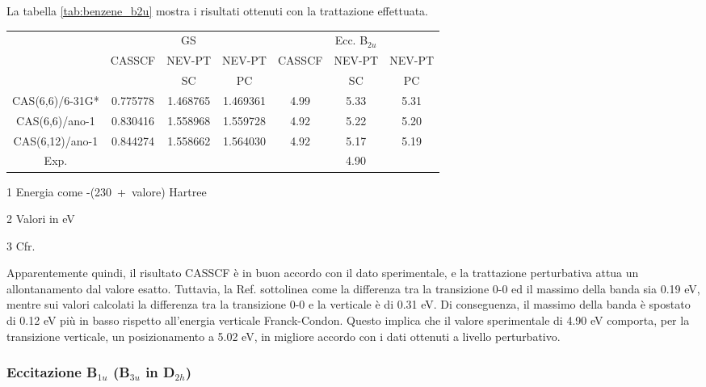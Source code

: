 La tabella \ref{tab:benzene_b2u} mostra i risultati ottenuti con la
trattazione effettuata.
\begin{center}
\begin{threeparttable}
\caption{\small Benzene - Energia della transizione di singoletto B$_{2u}$
(B$_{2u}$ in D$_{2h}$)}
\label{tab:benzene_b2u}
{
\small
\begin{tabular}{|c|ccc|ccc|}
\hline
 				& \multicolumn{3}{c|}{GS\tnote{1}}				& \multicolumn{3}{c|}{Ecc. B$_{2u}$\tnote{2}} \\
				& CASSCF	& NEV-PT	& NEV-PT	& CASSCF		& NEV-PT	& NEV-PT \\
				&			& SC		& PC		& 				& SC		& PC \\
\hline
CAS(6,6)/6-31G*	& 0.775778	& 1.468765	& 1.469361	& 4.99			& 5.33		& 5.31		\\
CAS(6,6)/ano-1	& 0.830416	& 1.558968	& 1.559728	& 4.92			& 5.22		& 5.20		\\
CAS(6,12)/ano-1	& 0.844274	& 1.558662	& 1.564030	& 4.92			& 5.17		& 5.19		\\
\hline
\hline
Exp.\tnote{3}	&				& 				&				& \multicolumn{3}{c|}{4.90} \\
\hline
\end{tabular}
}
\begin{tablenotes}
\small
 \item[1] Energia come \mbox{-(230 + valore)} Hartree
 \item[2] Valori in eV
 \item[3] Cfr. \cite{jcp-94-12-1991-7700}
\end{tablenotes}
\end{threeparttable}
\end{center}

Apparentemente quindi, il risultato CASSCF \`e in buon accordo con il dato
sperimentale, e la trattazione perturbativa attua un allontanamento dal
valore esatto. Tuttavia, la Ref. \cite{jcp-112-6-2000-2798} sottolinea come
la differenza tra la transizione 0-0 ed il massimo della banda sia 0.19 eV,
mentre sui valori calcolati la differenza tra la transizione 0-0 e la
verticale \`e di 0.31 eV. Di conseguenza, il massimo della banda \`e spostato
di 0.12 eV pi\`u in basso rispetto all'energia verticale Franck-Condon.
Questo implica che il valore sperimentale di 4.90 eV comporta, per la
transizione verticale, un posizionamento a 5.02 eV, in migliore accordo
con i dati ottenuti a livello perturbativo.

\subsubsection{Eccitazione B$_{1u}$ (B$_{3u}$ in D$_{2h}$)}

